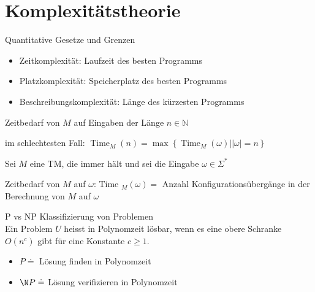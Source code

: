 \graphicspath{{images/}}

\section*{Komplexitätstheorie}

\begin{definition}{Quantitative Gesetze und Grenzen}

    \begin{itemize}
    \item Zeitkomplexität: Laufzeit des besten Programms
    \item Platzkomplexität: Speicherplatz des besten Programms
    \item Beschreibungskomplexität: Länge des kürzesten Programms
    \end{itemize}
\end{definition}

\begin{theorem}{Zeitbedarf}
    von $M$ auf Eingaben der Länge $n \in \mathbb{N}$ 
    
    im schlechtesten Fall: $\operatorname{Time}_{M}(n)=\max \left\{\operatorname{Time}_{M}(\omega)|| \omega \mid=n\right\}$
    
    \vspace{1mm}

    Sei $M$ eine TM, die immer hält und sei die Eingabe $\omega \in \Sigma^{*}$
    
    Zeitbedarf von $M$ auf $\omega$: Time $_{M}(\omega)=$ Anzahl Konfigurationsübergänge in der Berechnung von $M$ auf $\omega$
\end{theorem}

\begin{KR}{P vs NP}
    Klassifizierung von Problemen\\
    Ein Problem $U$ heisst in Polynomzeit lösbar, wenn es eine obere Schranke $O\left(n^{c}\right)$ gibt für eine Konstante $c \geq 1$.
    \begin{itemize}
    \item $P \doteq $ Lösung finden in Polynomzeit
    \item $\N P \doteq $ Lösung verifizieren in Polynomzeit
    \end{itemize}
\end{KR}

